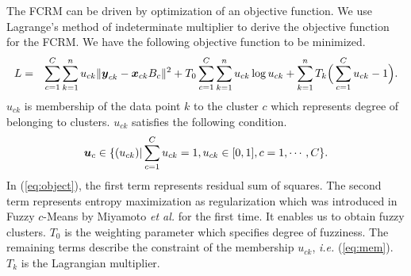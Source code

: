 \documentclass{article}
\newcommand{\vctr}[1]{\mbox{\boldmath $#1$}}
\begin{document}
The FCRM can be driven by optimization of an objective function. We use Lagrange's method of indeterminate multiplier to derive the objective function for the FCRM. We have the following objective function to be minimized.
%
\begin{eqnarray}
L &=& \sum_{c=1}^C \sum_{k=1}^n u_{ck} \| {\vctr y}_{ck} -  {\vctr x}_{ck}B_c \|^2 
 + T_0 \sum_{c=1}^C \sum_{k=1}^n u_{ck} \log u_{ck}
+ \sum_{k=1}^n T_k \Big( \sum_{c=1}^C u_{ck} - 1 \Big). 
\label{eq:object}
\end{eqnarray}
%
$u_{ck}$ is membership of the data point $k$ to the cluster $c$ which represents degree of belonging to clusters. $u_{ck}$ satisfies the following condition.
%
\begin{eqnarray}
{\vctr u}_c \in \{ (u_{ck}) | \sum_{c=1}^C u_{ck}= 1, u_{ck} \in [ 0,1 ], 
c = 1, \cdots , C \}.
\label{eq:mem}
\end{eqnarray}
%
In (\ref{eq:object}), the first term represents residual sum of squares. The second term represents entropy maximization as regularization which was introduced in Fuzzy $c$-Means by Miyamoto {\it et al.} \cite{Miyamoto} for the first time. It enables us to obtain fuzzy clusters. $T_0$ is the weighting parameter which specifies degree of fuzziness. The remaining terms describe the constraint of the membership $u_{ck}$, {\it i.e.} (\ref{eq:mem}). $T_k$ is the Lagrangian multiplier.
\end{document}
